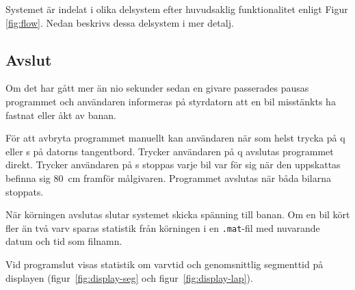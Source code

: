 Systemet är indelat i olika delsystem efter huvudsaklig funktionalitet enligt Figur
\ref{fig:flow}. Nedan beskrivs dessa delsystem i mer detalj.






\subsection{Avslut}

Om det har gått mer än nio sekunder sedan en givare passerades pausas programmet
och användaren informeras på styrdatorn att en bil misstänkts ha fastnat eller
åkt av banan. 

För att avbryta programmet manuellt kan användaren när som helst trycka på q
eller s på datorns tangentbord. Trycker användaren på q avslutas programmet
direkt. Trycker användaren på s stoppas varje bil var för sig när den uppskattas
befinna sig 80~cm framför målgivaren. Programmet avslutas när båda bilarna
stoppats.

När körningen avslutas slutar systemet skicka spänning till banan.
Om en bil kört fler än två varv sparas statistik från körningen i en
\texttt{.mat}-fil med nuvarande datum och tid som filnamn.

Vid programslut visas statistik om varvtid och genomsnittlig segmenttid på
displayen (figur~\ref{fig:display-seg} och figur~\ref{fig:display-lap}).

